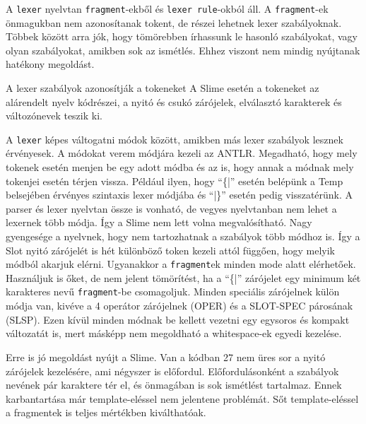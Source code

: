 {A \texttt{lexer} nyelvtan \texttt{fragment}-ekből és \texttt{lexer rule}-okból áll. 
A \texttt{fragment}-ek önmagukban nem azonosítanak tokent, de részei lehetnek lexer szabályoknak. 
Többek között arra jók, hogy tömörebben írhassunk le hasonló szabályokat, vagy olyan szabályokat, amikben sok az ismétlés. 
Ehhez viszont nem mindig nyújtanak hatékony megoldást.

A lexer szabályok azonosítják a tokeneket
A Slime esetén a tokeneket az alárendelt nyelv kódrészei, a nyitó és csukó zárójelek, elválasztó karakterek és változónevek teszik ki.

A \texttt{lexer} képes váltogatni módok között, amikben más lexer szabályok lesznek érvényesek. 
A módokat verem módjára kezeli az ANTLR. 
Megadható, hogy mely tokenek esetén menjen be egy adott módba és az is, hogy annak a módnak mely tokenjei esetén térjen vissza. 
Például ilyen, hogy “\{|” esetén belépünk a Temp belsejében érvényes szintaxis lexer módjába és “|\}” esetén pedig visszatérünk. 
A parser és lexer nyelvtan össze is vonható, de vegyes nyelvtanban nem lehet a lexernek több módja.
Így a Slime nem lett volna megvalósítható.
Nagy gyengesége a nyelvnek, hogy nem tartozhatnak a szabályok több módhoz is. 
Így a Slot nyitó zárójelét is hét különböző token kezeli attól függően, hogy melyik módból akarjuk elérni. 
Ugyanakkor a \texttt{fragment}ek  minden mode alatt elérhetőek. 
Használjuk is őket, de nem jelent tömörítést, ha a “\{|” zárójelet egy minimum két karakteres nevű \texttt{fragment}-be csomagoljuk.
Minden speciális zárójelnek külön módja van, kivéve a 4 operátor zárójelnek (OPER) és a SLOT-SPEC párosának (SLSP). 
Ezen kívül minden módnak be kellett vezetni egy egysoros és kompakt változatát is, mert másképp nem megoldható a whitespace-ek egyedi kezelése.

Erre is jó megoldást nyújt a Slime. 
Van a kódban 27 nem üres sor a nyitó zárójelek kezelésére, ami négyszer is előfordul.
Előfordulásonként a szabályok nevének pár karaktere tér el, és önmagában is sok ismétlést tartalmaz. 
Ennek karbantartása már template-eléssel nem jelentene problémát. 
Sőt template-eléssel a fragmentek is teljes mértékben kiválthatóak.

}
